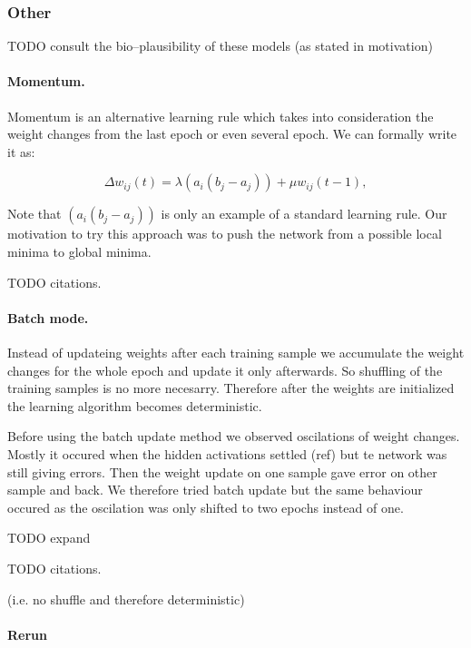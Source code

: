 
\subsubsection{Other}
TODO consult the bio--plausibility of these models (as stated in motivation) 

\paragraph{Momentum.}

Momentum is an alternative learning rule which takes into consideration the weight changes from the last epoch or even several epoch. We can formally write it as: 

\begin{equation}
\Delta w_{ij}(t) = \lambda (a_i(b_j - a_j)) + \mu w_{ij}(t-1), 
\end{equation} 

Note that $(a_i(b_j - a_j))$ is only an example of a standard learning rule. Our motivation to try this approach was to push the network from a possible local minima to global minima. 

TODO citations.  

\paragraph{Batch mode.}

Instead of updateing weights after each training sample we accumulate the weight changes for the whole epoch and update it only afterwards. So shuffling of the training samples is no more necesarry. Therefore after the weights are initialized the learning algorithm becomes deterministic.

Before using the batch update method we observed oscilations of weight changes. Mostly it occured when the hidden activations settled (ref) but te network was still giving errors. Then the weight update on one sample gave error on other sample and back. We therefore tried batch update but the same behaviour occured as the oscilation was only shifted to two epochs instead of one.  

TODO expand 

TODO citations. 

(i.e. no shuffle and therefore deterministic)

\paragraph{Rerun} 


